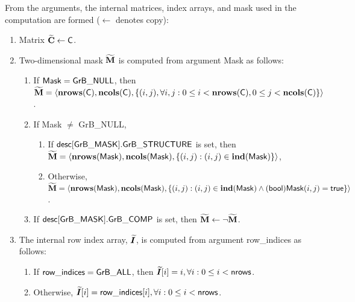 From the arguments, the internal matrices, index arrays, and mask used in 
the computation are formed ($\leftarrow$ denotes copy):
\begin{enumerate}
	\item Matrix ${\bf \widetilde{C}} \leftarrow {\sf C}$.

	\item Two-dimensional mask ${\bf \widetilde{M}}$ is computed from
    argument {\sf Mask} as follows:
	\begin{enumerate}
		\item If ${\sf Mask} = {\sf GrB\_NULL}$, then ${\bf \widetilde{M}} = 
        \langle \bold{nrows}({\sf C}), \bold{ncols}({\sf C}), \{(i,j), 
        \forall i,j : 0 \leq i <  \bold{nrows}({\sf C}), 0 \leq j < 
        \bold{ncols}({\sf C}) \} \rangle$.

		\item If {\sf Mask} $\ne$ {\sf GrB\_NULL},
        \begin{enumerate}
            \item If ${\sf desc[GrB\_MASK].GrB\_STRUCTURE}$ is set, then 
            ${\bf \widetilde{M}} = \langle \bold{nrows}({\sf Mask}), 
            \bold{ncols}({\sf Mask}), \{(i,j) : (i,j) \in \bold{ind}({\sf Mask}) \} \rangle$,
            \item Otherwise, ${\bf \widetilde{M}} = \langle \bold{nrows}({\sf Mask}), 
            \bold{ncols}({\sf Mask}), \\ \{(i,j) : (i,j) \in \bold{ind}({\sf Mask}) \wedge 
            ({\sf bool}){\sf Mask}(i,j) = {\sf true}\} \rangle$.
        \end{enumerate}

		\item	If ${\sf desc[GrB\_MASK].GrB\_COMP}$ is set, then 
        ${\bf \widetilde{M}} \leftarrow \neg {\bf \widetilde{M}}$.
	\end{enumerate}

    \item The internal row index array, $\bm{\widetilde{I}}$, is computed from 
    argument {\sf row\_indices} as follows:
	\begin{enumerate}
		\item	If ${\sf row\_indices} = {\sf GrB\_ALL}$, then 
        $\bm{\widetilde{I}}[i] = i, \forall i : 0 \leq i < {\sf nrows}$.

		\item	Otherwise, $\bm{\widetilde{I}}[i] = {\sf row\_indices}[i], 
        \forall i : 0 \leq i < {\sf nrows}$.
    \end{enumerate}
    

\end{enumerate}
